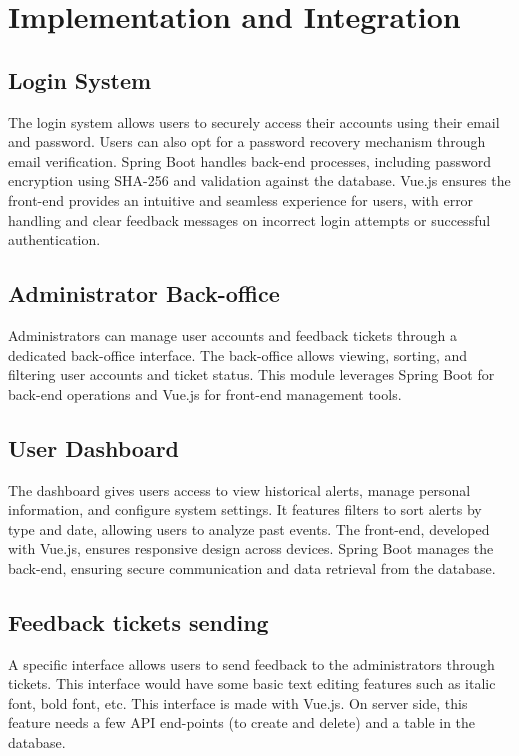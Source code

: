 \documentclass[conference]{IEEEtran}
\begin{document}
\section{Implementation and Integration}
\subsection{Login System}
The login system allows users to securely access their accounts using their email and password. Users can also opt for a password recovery mechanism through email verification. Spring Boot handles back-end processes, including password encryption using SHA-256 and validation against the database. Vue.js ensures the front-end provides an intuitive and seamless experience for users, with error handling and clear feedback messages on incorrect login attempts or successful authentication.

\subsection{Administrator Back-office}
Administrators can manage user accounts and feedback tickets through a dedicated back-office interface. The back-office allows viewing, sorting, and filtering user accounts and ticket status. This module leverages Spring Boot for back-end operations and Vue.js for front-end management tools.

\subsection{User Dashboard}
The dashboard gives users access to view historical alerts, manage personal information, and configure system settings. It features filters to sort alerts by type and date, allowing users to analyze past events. The front-end, developed with Vue.js, ensures responsive design across devices. Spring Boot manages the back-end, ensuring secure communication and data retrieval from the database.

\subsection{Feedback tickets sending}
A specific interface allows users to send feedback to the administrators through tickets. This interface would have some basic text editing features such as italic font, bold font, etc. This interface is made with Vue.js. On server side, this feature needs a few API end-points (to create and delete) and a table in the database.
\end{document}
